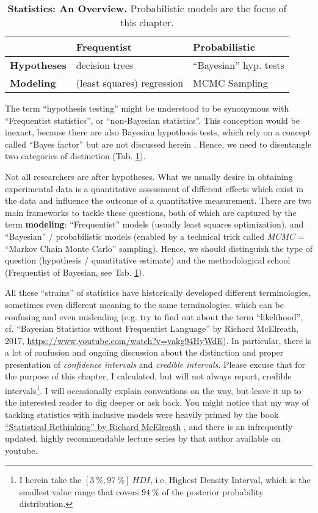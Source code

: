 \begin{table}[p]
\caption{\label{tab:statistics}\textbf{Statistics: An Overview.} Probabilistic models are the focus of this chapter.}
\centering
\begin{tabular}{|l|l|l|}
\hline
 & \textbf{Frequentist} & \textbf{Probabilistic}\\[0pt]
\hline
\textbf{Hypotheses} & decision trees & ``Bayesian'' hyp. tests\\[0pt]
\hline
\textbf{Modeling} & (least squares) regression & MCMC Sampling\\[0pt]
\hline
\end{tabular}
\end{table}


The term ``hypothesis testing'' might be understood to be synonymous with ``Frequentist statistics'', or ``non-Bayesian statistics''.
This conception would be inexact, because there are also Bayesian hypothesis tests, which rely on a concept called ``Bayes factor'' but are not discussed herein \citep[cf.][]{Shikano2019}.
Hence, we need to disentangle two categories of distinction (Tab. \ref{tab:statistics}).

Not all researchers are after hypotheses.
What we usually desire in obtaining experimental data is a quantitative assessment of different effects which exist in the data and influence the outcome of a quantitative measurement.
There are two main frameworks to tackle these questions, both of which are captured by the term \textbf{modeling}: ``Frequentist'' models (usually least squares optimization), and ``Bayesian'' / probabilistic models (enabled by a technical trick called \emph{MCMC} = ``Markov Chain Monte Carlo'' sampling).
Hence, we should distinguish the type of question (hypothesis / quantitative estimate) and the methodological school (Frequentist of Bayesian, see Tab. \ref{tab:statistics}).



All these ``strains'' of statistics have historically developed different terminologies, sometimes even different meaning to the same terminologies, which can be confusing and even misleading (e.g. try to find out about the term ``likelihood'', cf. ``Bayesian Statistics without Frequentist Language'' by Richard McElreath, 2017, \url{https://www.youtube.com/watch?v=yakg94HyWdE}).
In particular, there is a lot of confusion and ongoing discussion about the distinction and proper presentation of \emph{confidence intervals} and \emph{credible intervals}.
Please excuse that for the purpose of this chapter, I calculated, but will not always report, credible intervals\footnote{I herein take the $\left[3\ \%,97\ \%\right]\ HDI$, i.e. Highest Density Interval, which is the smallest value range that covers $94\ \%$ of the posterior probability distribution.}.
I will occasionally explain conventions on the way, but leave it up to the interested reader to dig deeper or ask back.
You might notice that my way of tackling statistics with inclusive models were heavily primed by the book \href{https://xcelab.net/rm/statistical-rethinking/}{``Statistical Rethinking'' by Richard McElreath} \citep{McElreath2018}, and there is an infrequently updated, highly recommendable lecture series by that author available on youtube.


